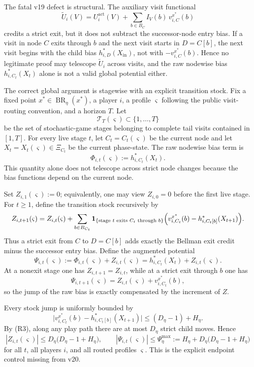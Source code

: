 \documentclass[12pt]{article}
\theoremstyle{definition}
\newcommand{\1}{\mathbf{1}}
\DeclareMathOperator{\BR}{BR}
\begin{document}
The fatal v19 defect is structural. The auxiliary visit functional
\[
\widetilde U_i(V)
=
U_i^{\mathrm{act}}(V)
+
\sum_{b\in B_C}I_V(b)\,v_{i,C}^{x^*}(b)
\]
credits a strict exit, but it does not subtract the successor-node entry bias. If
a visit in node $C$ exits through $b$ and the next visit starts in $D=C[b]$, the
next visit begins with the child bias $h_{i,D}^*(X_{\mathrm{in}})$, not with
$-v_{i,C}^{x^*}(b)$. Hence no legitimate proof may telescope
$\widetilde U_i$ across visits, and the raw nodewise bias
$h_{i,C_t}^*(X_t)$ alone is not a valid global potential either.

The correct global argument is stagewise with an explicit transition stock. Fix a
fixed point $x^*\in\BR_\eta(x^*)$, a player $i$, a profile $\varsigma$ following
the public visit-routing convention, and a horizon $T$. Let
\[
\mathcal T_T(\varsigma)\subset\{1,\dots,T\}
\]
be the set of stochastic-game stages belonging to complete tail visits contained
in $[1,T]$. For every live stage $t$, let $C_t=C_t(\varsigma)$ be the current
node and let $X_t=X_t(\varsigma)\in\Xi_{C_t}$ be the current phase-state. The raw
nodewise bias term is
\[
\Phi_{i,t}(\varsigma):=h_{i,C_t}^*(X_t).
\]
This quantity alone does not telescope across strict node changes because the
bias functions depend on the current node.

Set $Z_{i,1}(\varsigma):=0$; equivalently, one may view $Z_{i,0}=0$ before the
first live stage. For $t\ge 1$, define the transition stock recursively by
\begin{equation}
\label{eq:psi-stock-update}
Z_{i,t+1}(\varsigma)
=
Z_{i,t}(\varsigma)
+
\sum_{b\in B_{C_t}}
\1_{\{\textnormal{stage }t\textnormal{ exits }C_t\textnormal{ through }b\}}
\Bigl(
v_{i,C_t}^{x^*}(b)-h_{i,C_t[b]}^*(X_{t+1})
\Bigr).
\end{equation}
Thus a strict exit from $C$ to $D=C[b]$ adds exactly the Bellman exit credit
minus the successor entry bias. Define the augmented potential
\begin{equation}
\label{eq:psi-def}
\Psi_{i,t}(\varsigma)
:=
\Phi_{i,t}(\varsigma)+Z_{i,t}(\varsigma)
=
h_{i,C_t}^*(X_t)+Z_{i,t}(\varsigma).
\end{equation}
At a nonexit stage one has $Z_{i,t+1}=Z_{i,t}$, while at a strict exit through
$b$ one has
\[
\Psi_{i,t+1}(\varsigma)=Z_{i,t}(\varsigma)+v_{i,C_t}^{x^*}(b),
\]
so the jump of the raw bias is exactly compensated by the increment of $Z$.

Every stock jump is uniformly bounded by
\[
\bigl|v_{i,C_t}^{x^*}(b)-h_{i,C_t[b]}^*(X_{t+1})\bigr|
\le
(D_\eta-1)+H_\eta.
\]
By \textnormal{(R3)}, along any play path there are at
most $D_\eta$ strict child moves. Hence
\begin{equation}
\label{eq:psi-bound}
|Z_{i,t}(\varsigma)|
\le
D_\eta\bigl(D_\eta-1+H_\eta\bigr),
\qquad
|\Psi_{i,t}(\varsigma)|
\le
\Psi_\eta^{\max}:=
H_\eta+D_\eta\bigl(D_\eta-1+H_\eta\bigr)
\end{equation}
for all $t$, all players $i$, and all routed profiles $\varsigma$. This is the
explicit endpoint control missing from v20.
\end{document}
